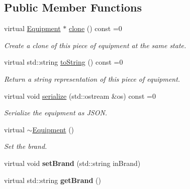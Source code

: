 \subsection*{Public Member Functions}
\begin{DoxyCompactItemize}
\item 
\hypertarget{class_equipment_a5c6929939d117e84e182e21a62a7723a}{}virtual \hyperlink{class_equipment}{Equipment} $\ast$ \hyperlink{class_equipment_a5c6929939d117e84e182e21a62a7723a}{clone} () const  =0\label{class_equipment_a5c6929939d117e84e182e21a62a7723a}

\begin{DoxyCompactList}\small\item\em Create a clone of this piece of equipment at the same state. \end{DoxyCompactList}\item 
\hypertarget{class_equipment_a970f5be54182c0067cb2cbb72c0029b6}{}virtual std\+::string \hyperlink{class_equipment_a970f5be54182c0067cb2cbb72c0029b6}{to\+String} () const  =0\label{class_equipment_a970f5be54182c0067cb2cbb72c0029b6}

\begin{DoxyCompactList}\small\item\em Return a string representation of this piece of equipment. \end{DoxyCompactList}\item 
\hypertarget{class_equipment_adc36912d637c7c445db05cab803abeb3}{}virtual void \hyperlink{class_equipment_adc36912d637c7c445db05cab803abeb3}{serialize} (std\+::ostream \&os) const  =0\label{class_equipment_adc36912d637c7c445db05cab803abeb3}

\begin{DoxyCompactList}\small\item\em Serialize the equipment as J\+S\+O\+N. \end{DoxyCompactList}\item 
\hypertarget{class_equipment_a7547b5114f15bb1bdc4ddc1c14da3c8d}{}virtual \hyperlink{class_equipment_a7547b5114f15bb1bdc4ddc1c14da3c8d}{$\sim$\+Equipment} ()\label{class_equipment_a7547b5114f15bb1bdc4ddc1c14da3c8d}

\begin{DoxyCompactList}\small\item\em Set the brand. \end{DoxyCompactList}\item 
\hypertarget{class_equipment_a15b661908f1f70cb15e910d59c879b01}{}virtual void {\bfseries set\+Brand} (std\+::string in\+Brand)\label{class_equipment_a15b661908f1f70cb15e910d59c879b01}

\item 
\hypertarget{class_equipment_adf98a9485c7dd511ee55b34e328f2eb0}{}virtual std\+::string {\bfseries get\+Brand} ()\label{class_equipment_adf98a9485c7dd511ee55b34e328f2eb0}

\end{DoxyCompactItemize}
